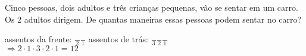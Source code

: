 \begin{ex}
Cinco pessoas, dois adultos e três crianças pequenas, vão se sentar em um carro. Os 2 adultos dirigem. De quantas maneiras essas pessoas podem sentar no carro?
  \begin{sol}
    \phantom{A}
    assentos da frente: $\frac{\phantom{A}}{2}\frac{\phantom{A}}{1}$  \hspace{0,6cm} assentos de trás: $\frac{\phantom{A}}{3}\frac{\phantom{A}}{2}\frac{\phantom{A}}{1}$\\
    $\Longrightarrow 2\cdot1\cdot3\cdot2\cdot1=12$
  \end{sol}
\end{ex}